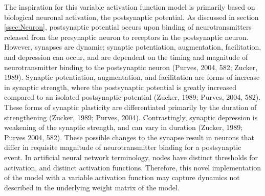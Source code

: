 \documentclass[11pt,titlepage]{article}
\begin{document}
The inspiration for this variable activation function model is primarily based on biological neuronal activation, the postsynaptic potential. As discussed in section \ref{ssec:Neuron}, postsynaptic potential occurs upon binding of neurotransmitters released from the presynaptic neuron to receptors in the postsynaptic neuron. However, synapses are dynamic; synaptic potentiation, augmentation, facilitation,  and depression can occur, and are dependent on the timing and magnitude of neurotransmitter binding to the postsynaptic neuron (Purves, 2004, 582; Zucker, 1989). Synaptic potentiation, augmentation, and facilitation are forms of increase in synaptic strength, where the postsynaptic potential is greatly increased compared to an isolated postsynaptic potential (Zucker, 1989; Purves, 2004, 582). These forms of synaptic plasticity are differentiated primarily by the duration of strengthening (Zucker, 1989; Purves, 2004). Contrastingly, synaptic depression is weakening of the synaptic strength, and can vary in duration (Zucker, 1989; Purves 2004, 582). These possible changes to the synapse result in neurons that differ in requisite magnitude of neurotransmitter binding for a postsynaptic event. In artificial neural network terminology, nodes have distinct thresholds for activation, and distinct activation functions. Therefore, this novel implementation of the model with a variable activation function may capture dynamics not described in the underlying weight matrix of the model.\par
\bigskip
\bigskip
\bigskip
\end{document}

